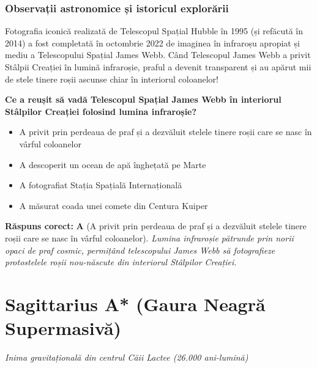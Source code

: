 \subsubsection*{Observații astronomice și istoricul explorării}
Fotografia iconică realizată de Telescopul Spațial Hubble în 1995 (și refăcută în 2014) a fost completată în octombrie 2022 de imaginea în infraroșu apropiat și mediu a Telescopului Spațial James Webb. Când Telescopul James Webb a privit Stâlpii Creației în lumină infraroșie, praful a devenit transparent și au apărut mii de stele tinere roșii ascunse chiar în interiorul coloanelor!

\vspace{6pt}
\begin{tcolorbox}[orbitarquiz, title={\textbf{Întrebare de verificare \#63: Stâlpii Creației (Nebuloasa Vulturului M16)}}]
\textbf{Ce a reușit să vadă Telescopul Spațial James Webb în interiorul Stâlpilor Creației folosind lumina infraroșie?}
\begin{itemize}[leftmargin=2.2em, itemsep=2pt, topsep=4pt]
  \item[$\square$ \textbf{A.}] A privit prin perdeaua de praf și a dezvăluit stelele tinere roșii care se nasc în vârful coloanelor
  \item[$\square$ \textbf{B.}] A descoperit un ocean de apă înghețată pe Marte
  \item[$\square$ \textbf{C.}] A fotografiat Stația Spațială Internațională
  \item[$\square$ \textbf{D.}] A măsurat coada unei comete din Centura Kuiper
\end{itemize}
\vspace{2pt}
{\footnotesize\color{orbitarMuted}\textbf{Răspuns corect:} \textbf{A} (A privit prin perdeaua de praf și a dezvăluit stelele tinere roșii care se nasc în vârful coloanelor). \emph{Lumina infraroșie pătrunde prin norii opaci de praf cosmic, permițând telescopului James Webb să fotografieze protostelele roșii nou-născute din interiorul Stâlpilor Creației.}}
\end{tcolorbox}
\clearpage


\section{Sagittarius A* (Gaura Neagră Supermasivă)}
\label{sec:body-sagittarius_a}
\vspace{-4pt}
{\large\itshape\color{orbitarAccent} Inima gravitațională din centrul Căii Lactee (26.000 ani-lumină)}\\[4pt]


